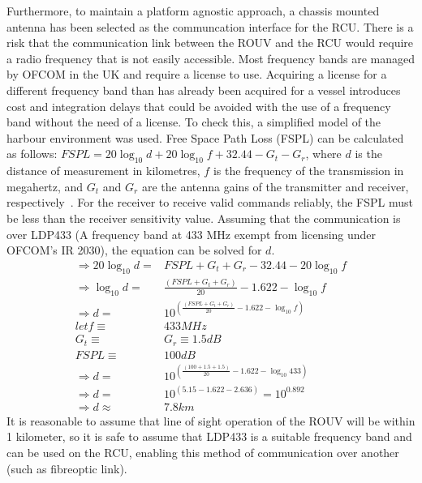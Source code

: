 \documentclass[../main.tex]{subfiles}
\begin{document}
Furthermore, to maintain a platform agnostic approach, a chassis mounted antenna has been selected as the communcation interface for the RCU\@.
There is a risk that the communication link between the ROUV and the RCU would require a radio frequency that is not easily accessible.
Most frequency bands are managed by OFCOM in the UK and require a license to use.
Acquiring a license for a different frequency band than has already been acquired for a vessel introduces cost and integration delays that could be avoided with the use of a frequency band without the need of a license.
To check this, a simplified model of the harbour environment was used.
Free Space Path Loss (FSPL) can be calculated as follows:
$FSPL = 20 \log_{10}{d} + 20 \log_{10}{f} + 32.44 - G_{t} - G_{r}$, where $d$ is the distance of measurement in kilometres, $f$ is the frequency of the transmission in megahertz, and $G_{t}$ and $G_{r}$ are the antenna gains of the transmitter and receiver, respectively~\cite{IEEEAntennasandPropagationSociety2013}\cite{Kou2000}.
For the receiver to receive valid commands reliably, the FSPL must be less than the receiver sensitivity value.
Assuming that the communication is over LDP433 (A frequency band at 433 MHz exempt from licensing under OFCOM's IR 2030\cite{OFCOM2023}), the equation can be solved for $d$.
\begin{align*}
    \Rightarrow 20\log_{10}{d} =& FSPL + G_{t} + G_{r} - 32.44 - 20\log_{10}{f} \\
    \Rightarrow \log_{10}{d} =& \frac{\left(FSPL + G_{t} + G_{r}\right)}{20} - 1.622 - \log_{10}{f} \\
    \Rightarrow d =& 10^{\left(\frac{\left(FSPL + G_{t} + G_{r}\right)}{20} - 1.622 - \log_{10}{f}\right)} \\
    let f \equiv& 433 MHz \\
    G_{t} \equiv& G_{r} \equiv 1.5 dB \\ 
    FSPL \equiv& 100 dB \\
    \Rightarrow d =& 10 ^{\left(\frac{\left(100 + 1.5 + 1.5\right)}{20}-1.622-\log_{10}{433}\right)} \\
    \Rightarrow d =& 10 ^{\left(5.15 - 1.622 - 2.636\right)} = 10^{0.892} \\
    \Rightarrow d \approx& 7.8 km
\end{align*}
It is reasonable to assume that line of sight operation of the ROUV will be within 1 kilometer, so it is safe to assume that LDP433 is a suitable frequency band and can be used on the RCU, enabling this method of communication over another (such as fibreoptic link).
\end{document}
